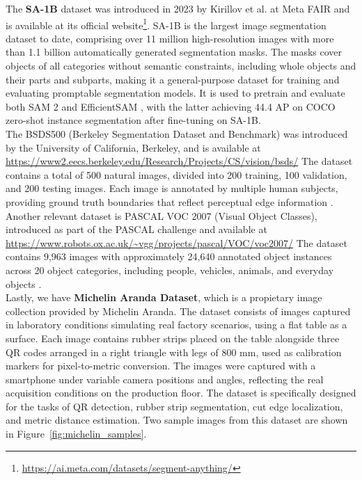 \documentclass[11pt]{article}
\begin{document}

The \textbf{SA-1B} dataset was introduced in 2023 by Kirillov et al. at Meta FAIR 
and is available at its official 
website\footnote{\url{https://ai.meta.com/datasets/segment-anything/}}. SA-1B is 
the largest image segmentation dataset to date, comprising over 11 million 
high-resolution images with more than 1.1 billion automatically generated segmentation 
masks. The masks cover objects of all categories without semantic constraints, 
including whole objects and their parts and subparts, making it a general-purpose 
dataset for training and evaluating promptable segmentation models. It is used to 
pretrain and evaluate both SAM 2 \cite{Ravi2024SAM2} and EfficientSAM 
\cite{Xiong2023EfficientSAM}, with the latter achieving 44.4 AP on COCO zero-shot 
instance segmentation after fine-tuning on SA-1B.\\


The BSDS500 (Berkeley Segmentation Dataset and Benchmark) was introduced by the University of California, Berkeley, and is available at \url{https://www2.eecs.berkeley.edu/Research/Projects/CS/vision/bsds/} The dataset contains a total of 500 natural images, divided into 200 training, 100 validation, and 200 testing images. Each image is annotated by multiple human subjects, providing ground truth boundaries that reflect perceptual edge information \cite{Martin2001BSDS,Arbelaez2011ContourDetection}.\\

Another relevant dataset is PASCAL VOC 2007 (Visual Object Classes), introduced as part of the PASCAL challenge and available at \url{https://www.robots.ox.ac.uk/~vgg/projects/pascal/VOC/voc2007/} The dataset contains 9,963 images with approximately 24,640 annotated object instances across 20 object categories, including people, vehicles, animals, and everyday objects \cite{Everingham2010PASCALVOC}.\\

Lastly, we have \textbf{Michelin Aranda Dataset}, which is a propietary image collection provided by
Michelin Aranda. The dataset consists of images 
captured in laboratory conditions simulating real factory scenarios, using a flat table 
as a surface. Each image contains rubber strips placed on the table alongside three QR 
codes arranged in a right triangle with legs of 800 mm, used as calibration markers 
for pixel-to-metric conversion. The images were captured with a smartphone under 
variable camera positions and angles, reflecting the real acquisition conditions on 
the production floor. The dataset is specifically designed for the tasks of QR 
detection, rubber strip segmentation, cut edge localization, and metric distance 
estimation. Two sample images from this dataset are shown in 
Figure~\ref{fig:michelin_samples}.
\end{document}
